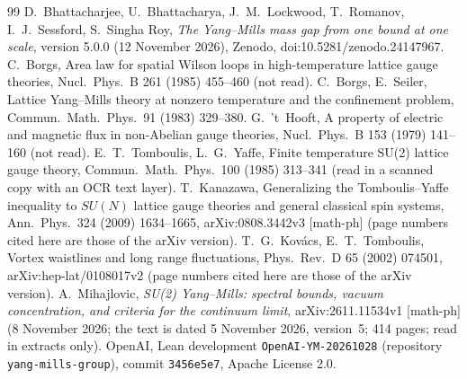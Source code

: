 \documentclass[11pt,a4paper]{article}
\theoremstyle{plain}
\theoremstyle{definition}
\theoremstyle{remark}
\numberwithin{equation}{section}
\begin{document}
{\small
\begin{thebibliography}{99}\setlength{\itemsep}{1pt}
 D.~Bhattacharjee, U.~Bhattacharya, J.~M.~Lockwood, T.~Romanov, I.~J.~Sessford, S.~Singha Roy, \emph{The Yang--Mills mass gap from one bound at one scale}, version 5.0.0 (12 November 2026), Zenodo, doi:10.5281/zenodo.24147967.
 C.~Borgs, Area law for spatial Wilson loops in high-temperature lattice gauge theories, Nucl.\ Phys.\ B 261 (1985) 455--460 (not read).
 C.~Borgs, E.~Seiler, Lattice Yang--Mills theory at nonzero temperature and the confinement problem, Commun.\ Math.\ Phys.\ 91 (1983) 329--380.
 G.~'t~Hooft, A property of electric and magnetic flux in non-Abelian gauge theories, Nucl.\ Phys.\ B 153 (1979) 141--160 (not read).
 E.~T.~Tomboulis, L.~G.~Yaffe, Finite temperature SU(2) lattice gauge theory, Commun.\ Math.\ Phys.\ 100 (1985) 313--341 (read in a scanned copy with an OCR text layer).
 T.~Kanazawa, Generalizing the Tomboulis--Yaffe inequality to $SU(N)$ lattice gauge theories and general classical spin systems, Ann.\ Phys.\ 324 (2009) 1634--1665, arXiv:0808.3442v3 [math-ph] (page numbers cited here are those of the arXiv version).
 T.~G.~Kov\'acs, E.~T.~Tomboulis, Vortex waistlines and long range fluctuations, Phys.\ Rev.\ D 65 (2002) 074501, arXiv:hep-lat/0108017v2 (page numbers cited here are those of the arXiv version). A.~Mihajlovic, \emph{SU(2) Yang--Mills: spectral bounds, vacuum concentration, and criteria for the continuum limit}, arXiv:2611.11534v1 [math-ph] (8 November 2026; the text is dated 5 November 2026, version~5; 414 pages; read in extracts only).
 OpenAI, Lean development \texttt{OpenAI-YM-20261028} (repository \texttt{yang-mills-group}), commit \texttt{3456e5e7}, Apache License 2.0.
\end{thebibliography}}
\end{document}
